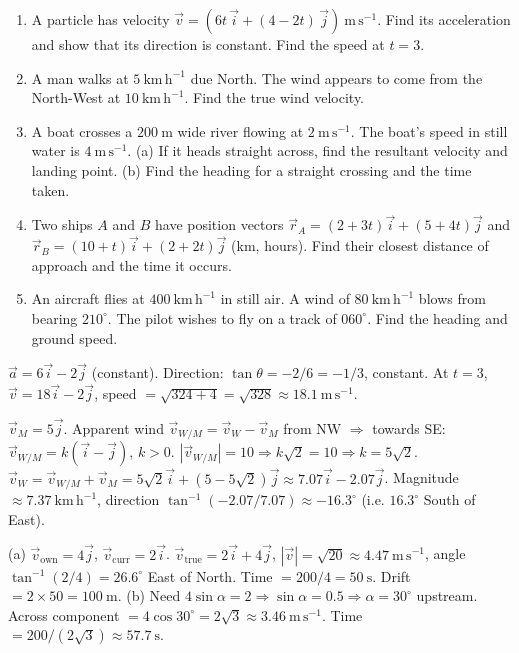 \documentclass[11pt]{article}
\begin{document}
\begin{exercice}
\begin{enumerate}
\item A particle has velocity $\vec{v} = (6t\,\vec{i} + (4-2t)\,\vec{j})\ \mathrm{m\,s^{-1}}$. Find its acceleration and show that its direction is constant. Find the speed at $t=3$.
\item A man walks at $5\ \mathrm{km\,h^{-1}}$ due North. The wind appears to come from the North-West at $10\ \mathrm{km\,h^{-1}}$. Find the true wind velocity.
\item A boat crosses a $200\ \mathrm{m}$ wide river flowing at $2\ \mathrm{m\,s^{-1}}$. The boat's speed in still water is $4\ \mathrm{m\,s^{-1}}$. (a) If it heads straight across, find the resultant velocity and landing point. (b) Find the heading for a straight crossing and the time taken.
\item Two ships $A$ and $B$ have position vectors $\vec{r}_A = (2+3t)\vec{i} + (5+4t)\vec{j}$ and $\vec{r}_B = (10+t)\vec{i} + (2+2t)\vec{j}$ (km, hours). Find their closest distance of approach and the time it occurs.
\item An aircraft flies at $400\ \mathrm{km\,h^{-1}}$ in still air. A wind of $80\ \mathrm{km\,h^{-1}}$ blows from bearing $210^\circ$. The pilot wishes to fly on a track of $060^\circ$. Find the heading and ground speed.
\end{enumerate}
\end{exercice}

\begin{corrige}[Exercise 1]
$\vec{a} = 6\vec{i} - 2\vec{j}$ (constant). Direction: $\tan\theta = -2/6 = -1/3$, constant. At $t=3$, $\vec{v} = 18\vec{i} - 2\vec{j}$, speed $= \sqrt{324+4} = \sqrt{328} \approx 18.1\ \mathrm{m\,s^{-1}}$.
\end{corrige}

\begin{corrige}[Exercise 2]
$\vec{v}_M = 5\vec{j}$. Apparent wind $\vec{v}_{W/M} = \vec{v}_W - \vec{v}_M$ from NW $\Rightarrow$ towards SE: $\vec{v}_{W/M} = k(\vec{i} - \vec{j})$, $k>0$. $|\vec{v}_{W/M}| = 10 \Rightarrow k\sqrt{2}=10 \Rightarrow k=5\sqrt{2}$.
$\vec{v}_W = \vec{v}_{W/M} + \vec{v}_M = 5\sqrt{2}\vec{i} + (5-5\sqrt{2})\vec{j} \approx 7.07\vec{i} - 2.07\vec{j}$.
Magnitude $\approx 7.37\ \mathrm{km\,h^{-1}}$, direction $\tan^{-1}(-2.07/7.07) \approx -16.3^\circ$ (i.e. $16.3^\circ$ South of East).
\end{corrige}

\begin{corrige}[Exercise 3]
(a) $\vec{v}_{\text{own}} = 4\vec{j}$, $\vec{v}_{\text{curr}} = 2\vec{i}$. $\vec{v}_{\text{true}} = 2\vec{i} + 4\vec{j}$, $|\vec{v}| = \sqrt{20} \approx 4.47\ \mathrm{m\,s^{-1}}$, angle $\tan^{-1}(2/4)=26.6^\circ$ East of North. Time $= 200/4 = 50\ \mathrm{s}$. Drift $= 2\times50 = 100\ \mathrm{m}$.
(b) Need $4\sin\alpha = 2 \Rightarrow \sin\alpha = 0.5 \Rightarrow \alpha = 30^\circ$ upstream. Across component $= 4\cos30^\circ = 2\sqrt{3} \approx 3.46\ \mathrm{m\,s^{-1}}$. Time $= 200/(2\sqrt{3}) \approx 57.7\ \mathrm{s}$.
\end{corrige}
\end{document}
